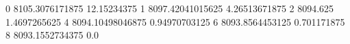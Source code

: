 0 8105.3076171875 12.15234375
1 8097.42041015625 4.26513671875
2 8094.625 1.4697265625
4 8094.10498046875 0.94970703125
6 8093.8564453125 0.701171875
8 8093.1552734375 0.0
